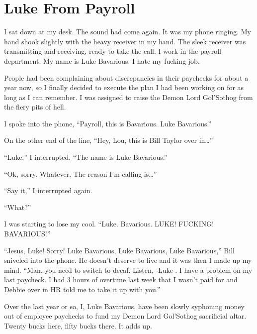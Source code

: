 \chapter{Luke From Payroll}


I sat down at my desk. The sound had come again. It was my phone
ringing. My hand shook slightly with the heavy receiver in my hand.
The sleek receiver was transmitting and receiving, ready to take
the call. I work in the payroll department. My name is Luke
Bavarious. I hate my fucking job.



People had been complaining about discrepancies in their paychecks
for about a year now, so I finally decided to execute the plan I
had been working on for as long as I can remember. I was assigned
to raise the Demon Lord Gol'Sothog from the fiery pits of
hell.



I spoke into the phone, ``Payroll, this is Bavarious. Luke
Bavarious.''



On the other end of the line, ``Hey, Lou, this is Bill Taylor over
in{\ldots}''



``Luke,'' I interrupted. ``The name is Luke Bavarious.''



``Ok, sorry. Whatever. The reason I'm calling is{\ldots}''



``Say it,'' I interrupted again.



``What?''



I was starting to lose my cool. ``Luke. Bavarious. LUKE! FUCKING!
BAVARIOUS!''



``Jesus, Luke! Sorry! Luke Bavarious, Luke Bavarious, Luke
Bavarious,'' Bill sniveled into the phone. He doesn't deserve to
live and it was then I made up my mind. ``Man, you need to switch to
decaf. Listen, -Luke-. I have a problem on my last paycheck. I had
3 hours of overtime last week that I wasn't paid for and Debbie
over in HR told me to take it up with you.''



Over the last year or so, I, Luke Bavarious, have been slowly
syphoning money out of employee paychecks to fund my Demon Lord
Gol'Sothog sacrificial altar. Twenty bucks here, fifty bucks there.
It adds up.



